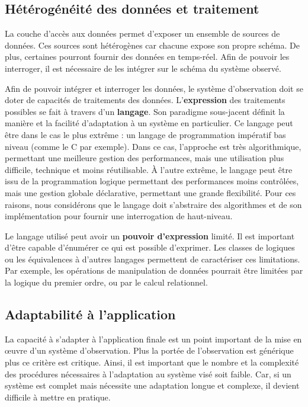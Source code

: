 \subsection{Hétérogénéité des données et traitement}
La couche d'accès aux données permet d'exposer un ensemble de sources de données. Ces sources sont hétérogènes car chacune expose son propre schéma. De plus, certaines pourront fournir des données en temps-réel. Afin de pouvoir les interroger, il est nécessaire de les intégrer sur le schéma du système observé.

Afin de pouvoir intégrer et interroger les données, le système d'observation doit se doter de capacités de traitements des données. L'\textbf{expression} des traitements possibles se fait à travers d'un \textbf{langage}. Son paradigme sous-jacent définit la manière et la facilité d'adaptation à un système en particulier. Ce langage peut être dans le cas le plus extrême : un langage de programmation impératif bas niveau (comme le C par exemple). Dans ce cas, l'approche est très algorithmique, permettant une meilleure gestion des performances, mais une utilisation plus difficile, technique et moins réutilisable. À l'autre extrême, le langage peut être issu de la programmation logique permettant des performances moins contrôlées, mais une gestion globale déclarative, permettant une grande flexibilité. Pour ces raisons, nous considérons que le langage doit s'abstraire des algorithmes et de son implémentation pour fournir une interrogation de haut-niveau.

Le langage utilisé peut avoir un \textbf{pouvoir d'expression} limité. Il est important d'être capable d'énumérer ce qui est possible d'exprimer. Les classes de logiques ou les équivalences à d'autres langages permettent de caractériser ces limitations. Par exemple, les opérations de manipulation de données pourrait être limitées par la logique du premier ordre, ou par le calcul relationnel.

\subsection{Adaptabilité à l'application}
La capacité à s'adapter à l'application finale est un point important de la mise en œuvre d'un système d'observation. Plus la portée de l'observation est générique plus ce critère est critique. Ainsi, il est important que le nombre et la complexité des procédures nécessaires à l'adaptation au système visé soit faible. Car, si un système est complet mais nécessite une adaptation longue et complexe, il devient difficile à mettre en pratique.

